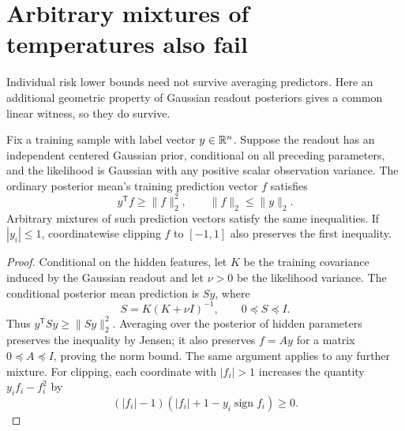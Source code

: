 \section{Arbitrary mixtures of temperatures also fail}
\label{sec:mixtures}
Individual risk lower bounds need not survive averaging predictors. Here an additional geometric property of Gaussian readout posteriors gives a common linear witness, so they do survive.

\begin{lemma}
\label{lem:sector}
Fix a training sample with label vector $y\in\mathbb R^n$. Suppose the readout has an independent centered Gaussian prior, conditional on all preceding parameters, and the likelihood is Gaussian with any positive scalar observation variance. The ordinary posterior mean's training prediction vector $f$ satisfies
\[
 y^{\mathsf T}f\ge\|f\|_2^2,\qquad \|f\|_2\le\|y\|_2.
\]
Arbitrary mixtures of such prediction vectors satisfy the same inequalities. If $|y_i|\le1$, coordinatewise clipping $f$ to $[-1,1]$ also preserves the first inequality.
\end{lemma}
\begin{proof}
Conditional on the hidden features, let $K$ be the training covariance induced by the Gaussian readout and let $\nu>0$ be the likelihood variance. The conditional posterior mean prediction is $Sy$, where
\[
 S=K(K+\nu I)^{-1},\qquad 0\preceq S\preceq I.
\]
Thus $y^{\mathsf T}Sy\ge\|Sy\|_2^2$. Averaging over the posterior of hidden parameters preserves the inequality by Jensen; it also preserves $f=Ay$ for a matrix $0\preceq A\preceq I$, proving the norm bound. The same argument applies to any further mixture. For clipping, each coordinate with $|f_i|>1$ increases the quantity $y_if_i-f_i^2$ by
\[
 (|f_i|-1)(|f_i|+1-y_i\operatorname{sign}f_i)\ge0.
\]
\end{proof}

